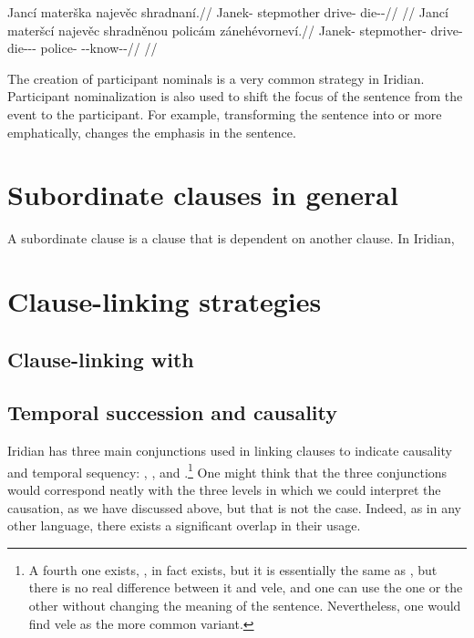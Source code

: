 \pex
\a\begingl
    \gla Jancí materška najevěc shradnaní.//
    \glb Janek-\Gen{} stepmother drive-\Cv{} die-\Pv{}-\Ret{}//
    \glft {}//
\endgl
\a\begingl
    \gla Jancí materšcí najevěc shradněnou policám zánehévorneví.//
    \glb Janek-\Gen{} stepmother-\Gen{} drive-\Cv{} die-\Pv{}-\Ret{}-\Nz{} police-\Agt{} \Neg{}-\Caus{}-know-\Pv{}-\Cont{}//
    \glft {}//
\endgl
\xe

The creation of participant nominals is a very common strategy in Iridian.
Participant nominalization is also used to shift the focus of the sentence from
the event to the participant. For example, transforming the sentence  into  or more
emphatically,  changes the emphasis
in the sentence.

\section{Subordinate clauses in general}

A subordinate clause is a clause that is dependent on another clause. In Iridian, 

\section{Clause-linking strategies}
\subsection{Clause-linking with }

\subsection{Temporal succession and causality}

Iridian has three main conjunctions used in linking clauses to indicate
causality and temporal sequency: , , and
.\footnote{A fourth one exists, , in fact exists, but it is
essentially the same as , but there is no real difference between it
and vele, and one can use the one or the other without changing the meaning of
the sentence. Nevertheless, one would find vele as the more common variant.} One
might think that the three conjunctions would correspond neatly with the three
levels in which we could interpret the causation, as we have discussed above,
but that is not the case. Indeed, as in any other language, there exists a
significant overlap in their usage.

